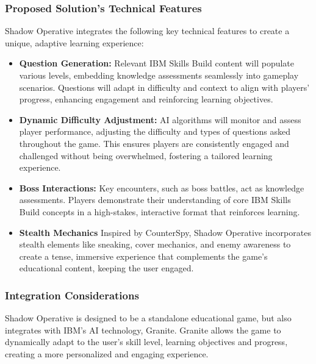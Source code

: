 \documentclass[11pt, a4paper]{article}
\begin{document}
\newpage

\subsubsection{Proposed Solution’s Technical Features}

\noindent Shadow Operative integrates the following key technical features to create a unique, adaptive learning experience:

\begin{itemize}
    \item \textbf{Question Generation:} Relevant IBM Skills Build content will populate various levels, embedding knowledge assessments seamlessly into gameplay scenarios. Questions will adapt in difficulty and context to align with players' progress, enhancing engagement and reinforcing learning objectives.

    \item \textbf{Dynamic Difficulty Adjustment:} AI algorithms will monitor and assess player performance, adjusting the difficulty and types of questions asked throughout the game. This ensures players are consistently engaged and challenged without being overwhelmed, fostering a tailored learning experience.

    \item \textbf{Boss Interactions:} Key encounters, such as boss battles, act as knowledge assessments. Players demonstrate their understanding of core IBM Skills Build concepts in a high-stakes, interactive format that reinforces learning.

    \item \textbf{Stealth Mechanics} Inspired by CounterSpy, Shadow Operative incorporates stealth elements like sneaking, cover mechanics, and enemy awareness to create a tense, immersive experience that complements the game's educational content, keeping the user engaged.
\end{itemize}

\subsubsection{Integration Considerations}


\noindent Shadow Operative is designed to be a standalone educational game, but
also integrates with IBM's AI technology, Granite. Granite allows the game to
dynamically adapt to the user's skill level, learning objectives and progress,
creating a more personalized and engaging experience.
\end{document}
